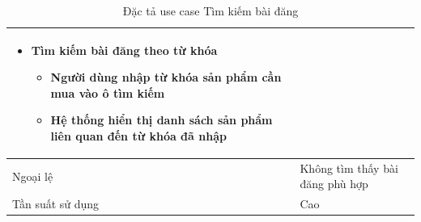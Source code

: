 \documentclass[../DoAn.tex]{subfiles}
\begin{document}
\begin{table}[H]
\begin{tabular}{|p{3cm}|p{12cm}|}
\begin{itemize}
\item Tìm kiếm bài đăng theo từ khóa
\begin{itemize}
\item Người dùng nhập từ khóa sản phẩm cần mua vào ô tìm kiếm
\item Hệ thống hiển thị danh sách sản phẩm liên quan đến từ khóa đã nhập
\end{itemize}
\end{itemize}                                 \\ \hline
Ngoại lệ            & Không tìm thấy bài đăng phù hợp                                                                                             \\ \hline
Tần suất sử dụng    & Cao                                                                                                                \\ \hline
\end{tabular}
\caption{Đặc tả use case Tìm kiếm bài đăng}
\label{tab:my-table}
\end{table}
\newpage
\end{document}

